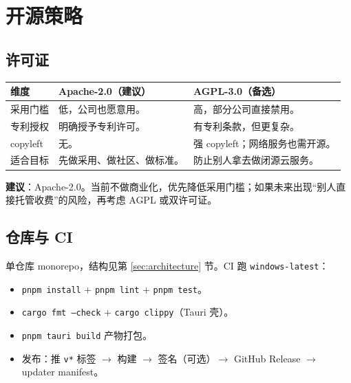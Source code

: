 \documentclass[UTF8,11pt,a4paper,fontset=windows]{ctexart}
\let\ocsection\section
\renewcommand{\section}{\Needspace{8\baselineskip}\ocsection}
\let\ocsubsection\subsection
\renewcommand{\subsection}{\Needspace{5\baselineskip}\ocsubsection}
\newcommand{\code}[1]{\texttt{#1}}
\begin{document}
\needspace{10cm}
\section{开源策略}
\label{sec:opensource}

\subsection{许可证}

\noindent\begin{minipage}{\linewidth}
\centering
{}
\small
\begin{tabularx}{\linewidth}{@{}p{2.6cm} X X@{}}
\toprule
\textbf{维度} & \textbf{Apache-2.0（建议）} & \textbf{AGPL-3.0（备选）} \\
\midrule
采用门槛 & 低，公司也愿意用。 & 高，部分公司直接禁用。 \\
专利授权 & 明确授予专利许可。 & 有专利条款，但更复杂。 \\
copyleft & 无。 & 强 copyleft；网络服务也需开源。 \\
适合目标 & 先做采用、做社区、做标准。 & 防止别人拿去做闭源云服务。 \\
\bottomrule
\end{tabularx}
\end{minipage}

\textbf{建议}：Apache-2.0。当前不做商业化，优先降低采用门槛；如果未来出现“别人直接托管收费”的风险，再考虑 AGPL 或双许可证。

\subsection{仓库与 CI}

单仓库 monorepo，结构见第 \ref{sec:architecture} 节。CI 跑 \code{windows-latest}：

\begin{itemize}
  \item \code{pnpm install} + \code{pnpm lint} + \code{pnpm test}。
  \item \code{cargo fmt --check} + \code{cargo clippy}（Tauri 壳）。
  \item \code{pnpm tauri build} 产物打包。
  \item 发布：推 \code{v*} 标签 $\rightarrow$ 构建 $\rightarrow$ 签名（可选）$\rightarrow$ GitHub Release $\rightarrow$ updater manifest。
\end{itemize}
\end{document}
